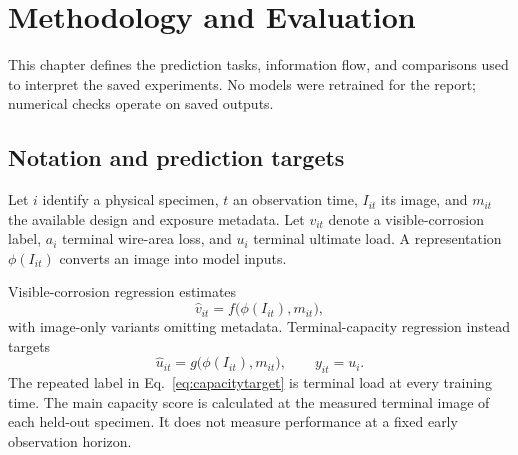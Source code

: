 \chapter{Methodology and Evaluation}\label{ch:methods}
This chapter defines the prediction tasks, information flow, and comparisons used to interpret the saved experiments. No models were retrained for the report; numerical checks operate on saved outputs.

\section{Notation and prediction targets}
Let $i$ identify a physical specimen, $t$ an observation time, $I_{it}$ its image, and $m_{it}$ the available design and exposure metadata. Let $v_{it}$ denote a visible-corrosion label, $a_i$ terminal wire-area loss, and $u_i$ terminal ultimate load. A representation $\phi(I_{it})$ converts an image into model inputs.

Visible-corrosion regression estimates
\begin{equation}\widehat v_{it}=f\bigl(\phi(I_{it}),m_{it}\bigr),\end{equation}
with image-only variants omitting metadata. Terminal-capacity regression instead targets
\begin{equation}\widehat u_{it}=g\bigl(\phi(I_{it}),m_{it}\bigr),\qquad y_{it}=u_i.\label{eq:capacitytarget}\end{equation}
The repeated label in Eq.~\eqref{eq:capacitytarget} is terminal load at every training time. The main capacity score is calculated at the measured terminal image of each held-out specimen. It does not measure performance at a fixed early observation horizon.

